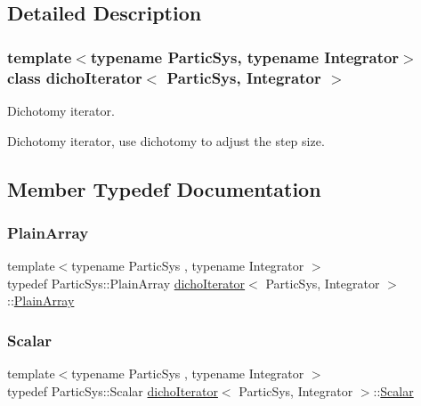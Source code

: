 \subsection{Detailed Description}
\subsubsection*{template$<$typename Partic\+Sys, typename Integrator$>$\newline
class dicho\+Iterator$<$ Partic\+Sys, Integrator $>$}

Dichotomy iterator. 

Dichotomy iterator, use dichotomy to adjust the step size. 

\subsection{Member Typedef Documentation}
\mbox{\label{classdicho_iterator_ab5b708b3b8a8fbd975c55231052d2547}} 
\subsubsection{\texorpdfstring{Plain\+Array}{PlainArray}}
{\footnotesize\ttfamily template$<$typename Partic\+Sys , typename Integrator $>$ \\
typedef Partic\+Sys\+::\+Plain\+Array \mbox{\hyperlink{classdicho_iterator}{dicho\+Iterator}}$<$ Partic\+Sys, Integrator $>$\+::\mbox{\hyperlink{classdicho_iterator_ab5b708b3b8a8fbd975c55231052d2547}{Plain\+Array}}}

\mbox{\label{classdicho_iterator_a292e986136313822f21b1b60d9cbb95d}} 
\subsubsection{\texorpdfstring{Scalar}{Scalar}}
{\footnotesize\ttfamily template$<$typename Partic\+Sys , typename Integrator $>$ \\
typedef Partic\+Sys\+::\+Scalar \mbox{\hyperlink{classdicho_iterator}{dicho\+Iterator}}$<$ Partic\+Sys, Integrator $>$\+::\mbox{\hyperlink{classdicho_iterator_a292e986136313822f21b1b60d9cbb95d}{Scalar}}}



